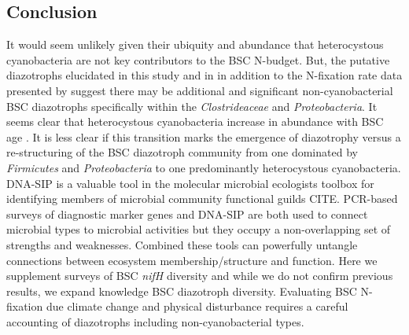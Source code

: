 \subsection{Conclusion}
It would seem unlikely given their ubiquity and abundance that heterocystous
cyanobacteria are not key contributors to the BSC N-budget. But, the putative
diazotrophs elucidated in this study and in \citet{Steppe_1996} in addition to
the N-fixation rate data presented by \citep{15643930} suggest there may be
additional and significant non-cyanobacterial BSC diazotrophs specifically
within the \textit{Clostrideaceae} and \textit{Proteobacteria}. It seems clear
that heterocystous cyanobacteria increase in abundance with BSC age
\citep{14766579}. It is less clear if this transition marks the emergence of
diazotrophy versus a re-structuring of the BSC diazotroph community from one
dominated by \textit{Firmicutes} and \textit{Proteobacteria} to one
predominantly heterocystous cyanobacteria. DNA-SIP is a valuable tool in the
molecular microbial ecologists toolbox for identifying members of microbial
community functional guilds CITE. PCR-based surveys of diagnostic marker genes
and DNA-SIP are both used to connect microbial types to microbial activities
but they occupy a non-overlapping set of strengths and weaknesses. Combined
these tools can powerfully untangle connections between ecosystem
membership/structure and function. Here we supplement surveys of BSC
\textit{nifH} diversity and while we do not confirm previous results, we expand
knowledge BSC diazotroph diversity. Evaluating BSC N-fixation due climate
change and physical disturbance requires a careful accounting of diazotrophs
including non-cyanobacterial types. 
